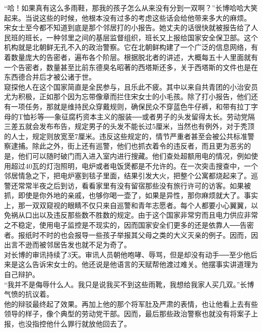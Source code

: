 \begin{multicols}{\theparacolNo}
“哈！如果真有这么多雨鞋，那我的孩子怎么从来没有分到一双啊？”长博哈哈大笑起来。当说这些的时候，他根本没有过多的考虑这些话会给他带来多大的麻烦。\\

宋女士至今都不知道到底是那个邻居打的小报告。她丈夫的话很快就被报告给了人民班的班长，一种邻里之间的基层监督组织，班长又上报给国家安全保卫部。这个机构就是北朝鲜无孔不入的政治警察。它在北朝鲜构建了一个广泛的信息网络，有着数量庞大的告密者，遍布各个阶层。根据脱北者的讲述，大概每五十人里面就有一个告密者，数量甚至比前东德臭名昭著的西塔斯还多，关于西塔斯的文件也是在东西德合并后才被公诸于世。\\

窥探他人在这个国家简直是全民参与，且乐此不疲。其中以来自共青团的小治安员尤为积极，正如那个因为忘带像章而拦住宋女士的小毛孩。除了打小报告，他们还有一项任务，那就是维持民众穿戴规则，确保民众不穿蓝色牛仔裤，和带有拉丁字母的T恤衫等──象征腐朽资本主义的服装──或者男子的头发留得太长。劳动党隔三差五就会发布布告，规定男子的头发不能长过5厘米，当然也有例外，对于秃顶的人士，规定则放宽至7厘米。违反这些规定的，情节严重者甚至会被公共标准警察逮捕。除此之外，街上还有巡警，他们也抓衣着令的违反者，而且更为恶劣的是，他们可以随时破门而入进入室内进行搜藏。他们查处超额用电的情况，例如使用超过40瓦的灯泡照明，电炉或者电饭煲都是不允许的。在一次突击搜查中，一个邻居情急之下，把电炉塞到毯子里面，结果引发大火，把整个公寓都烧起来了。巡警还常常半夜之后到访，看看家里有没有留宿那些没有旅行许可的访客。如果被抓，即使是你外地的亲戚，也够你喝一壶了，如果是异性，那你麻烦就大了。事实上，那一双双窥视的眼睛不仅只来自巡警和青年志愿者。每个人都要小心翼翼，以免祸从口出以及违反那些数不胜数的规定。由于这个国家非常穷而且电力供应非常之不稳定，使用电子监控是不现实的，因而国家安全们更多的还是依靠人──告密者。报纸时不时的也会报导一些孩子举报其父母之类的大义灭亲的例子。因而，因出言不逊而被邻居告发也就不足为奇了。\\

对长博的审讯持续了3天。审讯人员朝他咆哮、辱骂，但是却没有动手──至少他后来是这么告诉宋女士的。他还说是他语言的天赋帮他渡过难关。他摆事实讲道理为自己辩护。\\

“我并不是侮辱什么人。我只是说我买不到这些雨靴，我想给我家人买几双。”长博气愤的抗议着。\\

他的辩驳最终起了效果。再加上他的那个将军肚及严肃的表情，也让他看上去有些领导的样子，像个典型的劳动党干部。因而，最后那些政治警察也就没有将案子上报，也没指控他什么罪行就放他回去了。\\


\end{multicols}
